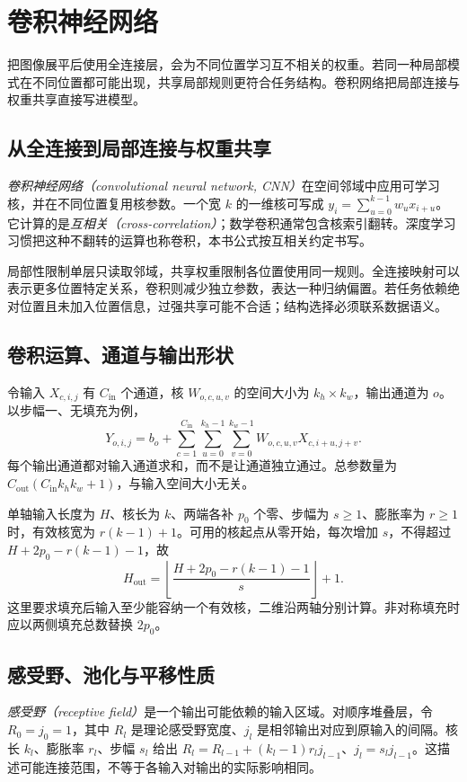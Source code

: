 \setcounter{chapter}{9} %
\chapter{卷积神经网络}
\label{chap:dl-cnn}
把图像展平后使用全连接层，会为不同位置学习互不相关的权重。若同一种局部模式在不同位置都可能出现，共享局部规则更符合任务结构。卷积网络把局部连接与权重共享直接写进模型。

\section{从全连接到局部连接与权重共享}
\emph{卷积神经网络（convolutional neural network, CNN）}在空间邻域中应用可学习核，并在不同位置复用核参数。一个宽 $k$ 的一维核可写成 $y_i=\sum_{u=0}^{k-1}w_ux_{i+u}$。它计算的是\emph{互相关（cross-correlation）}；数学卷积通常包含核索引翻转。深度学习习惯把这种不翻转的运算也称卷积，本书公式按互相关约定书写。

局部性限制单层只读取邻域，共享权重限制各位置使用同一规则。全连接映射可以表示更多位置特定关系，卷积则减少独立参数，表达一种归纳偏置。若任务依赖绝对位置且未加入位置信息，过强共享可能不合适；结构选择必须联系数据语义。

\section{卷积运算、通道与输出形状}
令输入 $X_{c,i,j}$ 有 $C_{\mathrm{in}}$ 个通道，核 $W_{o,c,u,v}$ 的空间大小为 $k_h\times k_w$，输出通道为 $o$。以步幅一、无填充为例，
\[
Y_{o,i,j}=b_o+\sum_{c=1}^{C_{\mathrm{in}}}\sum_{u=0}^{k_h-1}\sum_{v=0}^{k_w-1}W_{o,c,u,v}X_{c,i+u,j+v}.
\]
每个输出通道都对输入通道求和，而不是让通道独立通过。总参数量为 $C_{\mathrm{out}}(C_{\mathrm{in}}k_hk_w+1)$，与输入空间大小无关。

单轴输入长度为 $H$、核长为 $k$、两端各补 $p_0$ 个零、步幅为 $s\geq1$、膨胀率为 $r\geq1$ 时，有效核宽为 $r(k-1)+1$。可用的核起点从零开始，每次增加 $s$，不得超过 $H+2p_0-r(k-1)-1$，故
\begin{equation}
H_{\mathrm{out}}=\left\lfloor\frac{H+2p_0-r(k-1)-1}{s}\right\rfloor+1.
\label{eq:dl-conv-shape}
\end{equation}
这里要求填充后输入至少能容纳一个有效核，二维沿两轴分别计算。非对称填充时应以两侧填充总数替换 $2p_0$。

\section{感受野、池化与平移性质}
\emph{感受野（receptive field）}是一个输出可能依赖的输入区域。对顺序堆叠层，令 $R_0=j_0=1$，其中 $R_l$ 是理论感受野宽度、$j_l$ 是相邻输出对应到原输入的间隔。核长 $k_l$、膨胀率 $r_l$、步幅 $s_l$ 给出 $R_l=R_{l-1}+(k_l-1)r_lj_{l-1}$、$j_l=s_lj_{l-1}$。这描述可能连接范围，不等于各输入对输出的实际影响相同。

